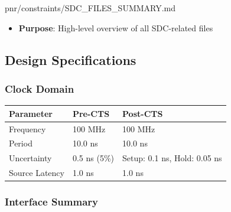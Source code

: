 \begin{relocated}{pnr/constraints/SDC_FILES_SUMMARY.md}
\begin{itemize}
\tightlist
\item
  \textbf{Purpose}: High-level overview of all SDC-related files
\end{itemize}

\subsection{Design Specifications}\label{tm:pd:constraints-sdc-files-summary:design-specifications}

\subsubsection{Clock Domain}\label{tm:pd:constraints-sdc-files-summary:clock-domain}

{
\begin{longtable}[]{@{}lll@{}}
\toprule\noalign{}
Parameter & Pre-CTS & Post-CTS \\
\midrule\noalign{}
\endhead
\bottomrule\noalign{}
\endlastfoot
Frequency & 100 MHz & 100 MHz \\
Period & 10.0 ns & 10.0 ns \\
Uncertainty & 0.5 ns (5\%) & Setup: 0.1 ns, Hold: 0.05 ns \\
Source Latency & 1.0 ns & 1.0 ns \\
\end{longtable}
}

\subsubsection{Interface Summary}\label{tm:pd:constraints-sdc-files-summary:interface-summary}


\end{relocated}
